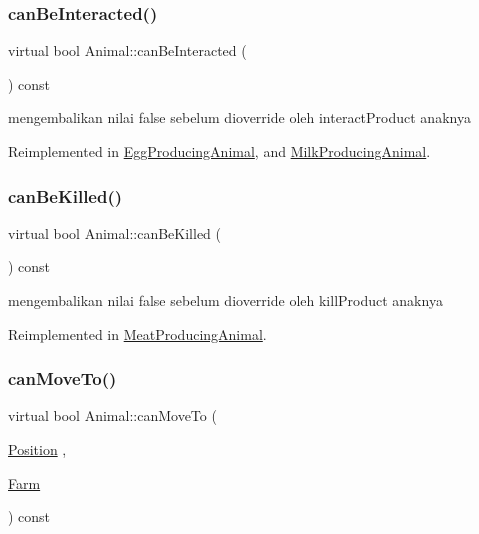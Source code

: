 \subsubsection{\texorpdfstring{canBeInteracted()}{canBeInteracted()}}
{\footnotesize\ttfamily virtual bool Animal\+::can\+Be\+Interacted (\begin{DoxyParamCaption}{ }\end{DoxyParamCaption}) const\hspace{0.3cm}{\ttfamily [virtual]}}

mengembalikan nilai false sebelum dioverride oleh interact\+Product anaknya 

Reimplemented in \mbox{\hyperlink{class_egg_producing_animal_a3ef46d5e81f8864869a7f6d63b4036d2}{Egg\+Producing\+Animal}}, and \mbox{\hyperlink{class_milk_producing_animal_a944bf91c66a5be0d3918cb71b1a1084b}{Milk\+Producing\+Animal}}.

\mbox{\label{class_animal_a87ada682cad67c91fb0cd0fda3395cd5}} 
\subsubsection{\texorpdfstring{canBeKilled()}{canBeKilled()}}
{\footnotesize\ttfamily virtual bool Animal\+::can\+Be\+Killed (\begin{DoxyParamCaption}{ }\end{DoxyParamCaption}) const\hspace{0.3cm}{\ttfamily [virtual]}}

mengembalikan nilai false sebelum dioverride oleh kill\+Product anaknya 

Reimplemented in \mbox{\hyperlink{class_meat_producing_animal_a796b39685df5e9d2a727d494254bfbee}{Meat\+Producing\+Animal}}.

\mbox{\label{class_animal_a0529aaf00a6368ea123110683cc4e2f2}} 
\subsubsection{\texorpdfstring{canMoveTo()}{canMoveTo()}}
{\footnotesize\ttfamily virtual bool Animal\+::can\+Move\+To (\begin{DoxyParamCaption}\item[{\mbox{\hyperlink{class_position}{Position}}}]{,  }\item[{\mbox{\hyperlink{class_farm}{Farm}}}]{ }\end{DoxyParamCaption}) const\hspace{0.3cm}{\ttfamily [virtual]}}

